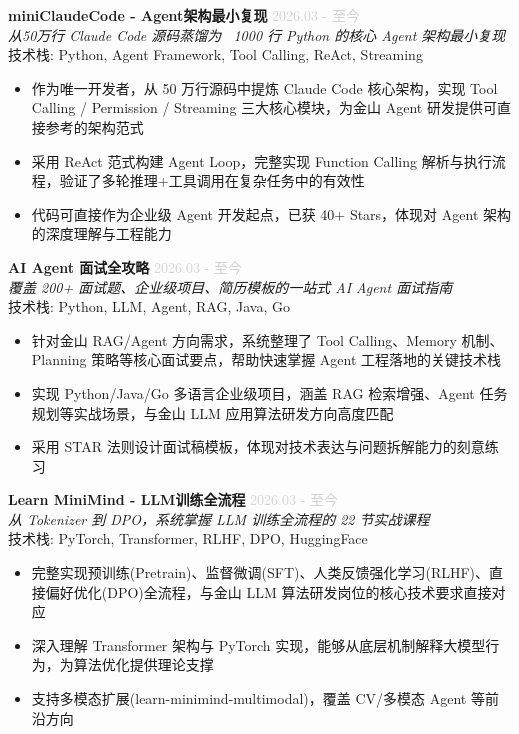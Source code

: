 \documentclass[11pt,a4paper]{article}
\begin{document}
\noindent\textbf{miniClaudeCode - Agent架构最小复现} \hfill \textcolor{lightgray}{2026.03 - 至今}\\
\textit{从50万行 Claude Code 源码蒸馏为 ~1000 行 Python 的核心 Agent 架构最小复现}\\
技术栈: Python, Agent Framework, Tool Calling, ReAct, Streaming
\begin{itemize}

  \item 作为唯一开发者，从 50 万行源码中提炼 Claude Code 核心架构，实现 Tool Calling / Permission / Streaming 三大核心模块，为金山 Agent 研发提供可直接参考的架构范式

  \item 采用 ReAct 范式构建 Agent Loop，完整实现 Function Calling 解析与执行流程，验证了多轮推理+工具调用在复杂任务中的有效性

  \item 代码可直接作为企业级 Agent 开发起点，已获 40+ Stars，体现对 Agent 架构的深度理解与工程能力

\end{itemize}


\noindent\textbf{AI Agent 面试全攻略} \hfill \textcolor{lightgray}{2026.03 - 至今}\\
\textit{覆盖 200+ 面试题、企业级项目、简历模板的一站式 AI Agent 面试指南}\\
技术栈: Python, LLM, Agent, RAG, Java, Go
\begin{itemize}

  \item 针对金山 RAG/Agent 方向需求，系统整理了 Tool Calling、Memory 机制、Planning 策略等核心面试要点，帮助快速掌握 Agent 工程落地的关键技术栈

  \item 实现 Python/Java/Go 多语言企业级项目，涵盖 RAG 检索增强、Agent 任务规划等实战场景，与金山 LLM 应用算法研发方向高度匹配

  \item 采用 STAR 法则设计面试稿模板，体现对技术表达与问题拆解能力的刻意练习

\end{itemize}


\noindent\textbf{Learn MiniMind - LLM训练全流程} \hfill \textcolor{lightgray}{2026.03 - 至今}\\
\textit{从 Tokenizer 到 DPO，系统掌握 LLM 训练全流程的 22 节实战课程}\\
技术栈: PyTorch, Transformer, RLHF, DPO, HuggingFace
\begin{itemize}

  \item 完整实现预训练(Pretrain)、监督微调(SFT)、人类反馈强化学习(RLHF)、直接偏好优化(DPO)全流程，与金山 LLM 算法研发岗位的核心技术要求直接对应

  \item 深入理解 Transformer 架构与 PyTorch 实现，能够从底层机制解释大模型行为，为算法优化提供理论支撑

  \item 支持多模态扩展(learn-minimind-multimodal)，覆盖 CV/多模态 Agent 等前沿方向

\end{itemize}
\end{document}
